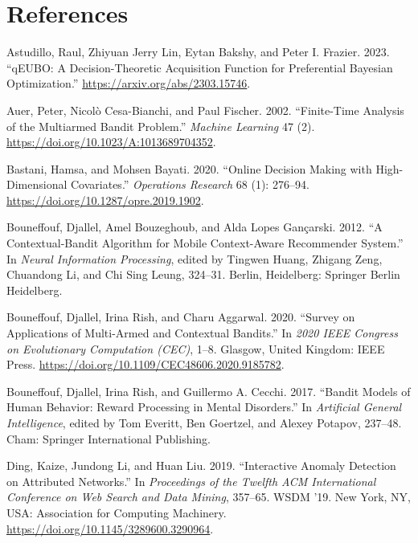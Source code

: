 \documentclass[
  letterpaper,
  numbers=noenddot,
  DIV=11]{scrreprt}
\newlength{\cslhangindent}
\newenvironment{CSLReferences}[2] %
 {\begin{list}{}{%
  \setlength{\itemindent}{0pt}
  \setlength{\leftmargin}{0pt}
  \setlength{\parsep}{0pt}
  \ifodd #1
   \setlength{\leftmargin}{\cslhangindent}
   \setlength{\itemindent}{-1\cslhangindent}
  \fi
  \setlength{\itemsep}{#2\baselineskip}}}
 {\end{list}}
\theoremstyle{plain}
\theoremstyle{definition}
\theoremstyle{plain}
\theoremstyle{remark}
\begin{document}
\section*{References}\label{bibliography-4}


\label{refs-4}
\begin{CSLReferences}{1}{0}
Astudillo, Raul, Zhiyuan Jerry Lin, Eytan Bakshy, and Peter I. Frazier.
2023. {``qEUBO: A Decision-Theoretic Acquisition Function for
Preferential Bayesian Optimization.''}
\url{https://arxiv.org/abs/2303.15746}.

Auer, Peter, Nicolò Cesa-Bianchi, and Paul Fischer. 2002. {``Finite-Time
Analysis of the Multiarmed Bandit Problem.''} \emph{Machine Learning} 47
(2). \url{https://doi.org/10.1023/A:1013689704352}.

Bastani, Hamsa, and Mohsen Bayati. 2020. {``Online Decision Making with
High-Dimensional Covariates.''} \emph{Operations Research} 68 (1):
276--94. \url{https://doi.org/10.1287/opre.2019.1902}.

Bouneffouf, Djallel, Amel Bouzeghoub, and Alda Lopes Gançarski. 2012.
{``A Contextual-Bandit Algorithm for Mobile Context-Aware Recommender
System.''} In \emph{Neural Information Processing}, edited by Tingwen
Huang, Zhigang Zeng, Chuandong Li, and Chi Sing Leung, 324--31. Berlin,
Heidelberg: Springer Berlin Heidelberg.

Bouneffouf, Djallel, Irina Rish, and Charu Aggarwal. 2020. {``Survey on
Applications of Multi-Armed and Contextual Bandits.''} In \emph{2020
IEEE Congress on Evolutionary Computation (CEC)}, 1--8. Glasgow, United
Kingdom: IEEE Press.
\url{https://doi.org/10.1109/CEC48606.2020.9185782}.

Bouneffouf, Djallel, Irina Rish, and Guillermo A. Cecchi. 2017.
{``Bandit Models of Human Behavior: Reward Processing in Mental
Disorders.''} In \emph{Artificial General Intelligence}, edited by Tom
Everitt, Ben Goertzel, and Alexey Potapov, 237--48. Cham: Springer
International Publishing.

Ding, Kaize, Jundong Li, and Huan Liu. 2019. {``Interactive Anomaly
Detection on Attributed Networks.''} In \emph{Proceedings of the Twelfth
ACM International Conference on Web Search and Data Mining}, 357--65.
WSDM '19. New York, NY, USA: Association for Computing Machinery.
\url{https://doi.org/10.1145/3289600.3290964}.


\end{CSLReferences}
\end{document}
